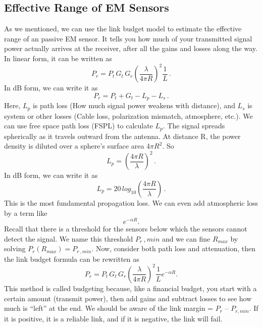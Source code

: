 \documentclass{article}
\begin{document}
\subsection{Effective Range of EM Sensors}
As we mentioned, we can use the link budget model to estimate the effective range of an passive EM sensor. It tells you how much of your transmitted signal power actually arrives at the receiver, after all the gains and losses along the way. In linear form, it can be written as
\begin{equation}
    P_r = P_t\, G_t\, G_r (\frac{\lambda}{4 \pi R})^2 \frac{1}{L}\, .
\end{equation}
In dB form, we can write it as
\begin{equation}
    P_r = P_t + G_t - L_p - L_s\, .
\end{equation}
Here, $L_p$ is path loss (How much signal power weakens with distance), and $L_s$ is system or other losses (Cable loss, polarization mismatch, atmosphere, etc.). We can use free space path loss (FSPL) to calculate $L_p$.
The signal spreads spherically as it travels outward from the antenna. At distance R, the power density is diluted over a sphere’s surface area 4$\pi R^2$. So
\begin{equation}
    L_p = (\frac{4 \pi R}{\lambda})^2\, .
\end{equation}
In dB form, we can write it as
\begin{equation}
    L_p = 20\, log_{10}(\frac{4 \pi R}{\lambda})\, .
\end{equation}
This is the most fundamental propagation loss. We can even add atmospheric loss by a term like 
\begin{equation}
    e^{-\alpha R}.
\end{equation}
Recall that there is a threshold for the sensors below which the sensors cannot detect the signal. We name this threshold $P_r\,, min$ and we can fine $R_{max}$ by solving $P_r(R_{max}) = P_{r\,, min}$.
 Now, consider both path loss and attenuation, then the link budget formula can be rewritten as
 \begin{equation}
     P_r = P_t\, G_t\, G_r (\frac{\lambda}{4 \pi R})^2 \frac{1}{L} e^{-\alpha R}.
     \label{effective-range-active}
 \end{equation}
 This method is called budgeting because, like a financial budget, you start with a certain amount (transmit power), then add gains and subtract losses to see how much is “left” at the end. 
 We should be aware of the link margin = $P_r$ – $P_{r, min}$. If it is positive, it is a reliable link, and if it is negative, the link will fail.
\end{document}
